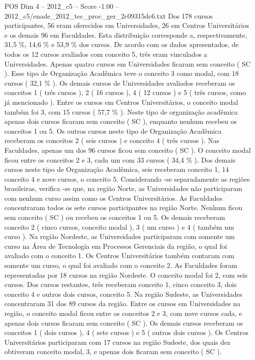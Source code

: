 \begin{textsample}{POS Dim 4 – 2012\_c5 – Score -1.00 – 2012\_c5/enade\_2012\_tec\_proc\_ger\_2c09315dc6.txt}
Dos 178 cursos participantes, 56 eram oferecidos em Universidades, 26 em Centros Universitários e os demais 96 em Faculdades.
Esta distribuição corresponde a, respectivamente, 31,5 \%, 14,6 \% e 53,9 \% dos cursos.
De acordo com os dados apresentados, de todos os 12 cursos avaliados com conceito 5, três eram vinculados a Universidades.
Apenas quatro cursos em Universidades ficaram sem conceito ( SC ).
Esse tipo de Organização Acadêmica teve o conceito 3 como modal, com 18 cursos ( 32,1 \% ).
Os demais cursos de Universidades avaliados receberam os conceitos 1 ( três cursos ), 2 ( 16 cursos ), 4 ( 12 cursos ) e 5 ( três cursos, como já mencionado ).
Entre os cursos em Centros Universitários, o conceito modal também foi 3, com 15 cursos ( 57,7 \% ).
Neste tipo de organização acadêmica apenas dois cursos ficaram sem conceito ( SC ), enquanto nenhum recebeu os conceitos 1 ou 5.
Os outros cursos neste tipo de Organização Acadêmica receberam os conceitos 2 ( seis cursos ) e conceito 4 ( três cursos ).
Nas Faculdades, apenas um dos 96 cursos ficou sem conceito ( SC ).
O conceito modal ficou entre os conceitos 2 e 3, cada um com 33 cursos ( 34,4 \% ).
Dos demais cursos neste tipo de Organização Acadêmica, seis receberam conceito 1, 14 conceito 4 e nove cursos, o conceito 5.
Considerando -se separadamente as regiões brasileiras, verifica -se que, na região Norte, as Universidades não participaram com nenhum curso assim como os Centros Universitários.
As Faculdades concentraram todos os sete cursos participantes na região Norte.
Nenhum ficou sem conceito ( SC ) ou recebeu os conceitos 1 ou 5.
Os demais receberam conceito 2 ( cinco cursos, conceito modal ), 3 ( um curso ) e 4 ( também um curso ).
Na região Nordeste, as Universidades participaram com somente um curso na Área de Tecnologia em Processos Gerenciais da região, o qual foi avaliado com o conceito 1.
Os Centros Universitários também contaram com somente um curso, o qual foi avaliado com o conceito 2.
As Faculdades foram representadas por 18 cursos na região Nordeste.
O conceito modal foi 2, com seis cursos.
Dos cursos restantes, três receberam conceito 1, cinco conceito 3, dois conceito 4 e outros dois cursos, conceito 5.
Na região Sudeste, as Universidades concentraram 31 dos 89 cursos da região.
Entre os cursos em Universidades na região, o conceito modal ficou entre os conceitos 2 e 3, com nove cursos cada, e apenas dois cursos ficaram sem conceito ( SC ).
Os demais cursos receberam os conceitos 1 ( dois cursos ), 4 ( sete cursos ) e 5 ( outros dois cursos ).
Os Centros Universitários participaram com 17 cursos na região Sudeste, dos quais dez obtiveram conceito modal, 3, e apenas dois ficaram sem conceito ( SC ).

\end{textsample}
